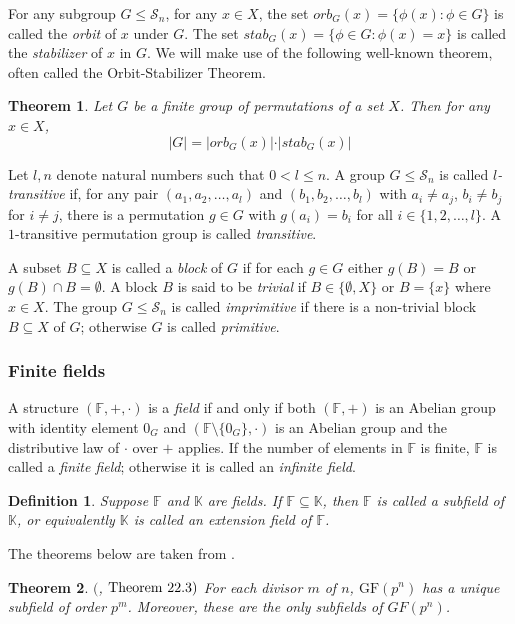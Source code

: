 \documentclass[11pt]{amsart}
\newcommand{\sym}{\mathcal{S}}
\newcommand{\GF}{\mathrm{GF}}
\newtheorem{definition}{{\bf Definition}}
\newtheorem{theorem}{{\bf Theorem }}
\begin{document}
For any subgroup $G\leq\sym_n$, for any $x\in X$, the set $orb_G(x)=\{\phi(x):\phi\in G\}$ is called the \emph{orbit} of $x$ under $G$. The set $stab_G(x)=\{\phi\in G:\phi (x)=x\}$ is called the \emph{stabilizer} of $x$ in $G$. We will make use of the following well-known theorem, often called the Orbit-Stabilizer Theorem.

\begin{theorem}
Let $G$ be a finite group of permutations of a set $X$. Then for any $x\in X$, 
\[
\vert G\vert=\vert orb_G(x)\vert\cdot\vert stab_G(x)\vert
\]
\end{theorem}
Let $l, n$ denote natural numbers such that $0<l\leq n$. A group $G\leq \sym_n$ is called \emph {$l$-transitive} if, for any pair $(a_1,a_2,\ldots,a_l)$ and $(b_1,b_2,\ldots,b_l)$ with $a_i\neq a_j$, $b_i\neq b_j$ for $i\neq j$, there is a permutation $g\in G$ with $g(a_i)=b_i$ for all $i\in \{1,2,\ldots,l\}$. A $1$-transitive permutation group is called \emph {transitive}. 

A subset $B\subseteq X$ is called a \emph {block} of $G$ if for each $g\in G$ either $g(B)=B$ or $g(B)\cap B =\emptyset$. 
A block $B$ is said to be \emph {trivial} if $B\in\{\emptyset,X\}$ or $B=\{x\}$ where $x\in X$. The group $G\leq \sym_n$ is called \emph{imprimitive} if there is a non-trivial block $B\subseteq X$ of $G$; otherwise $G$ is called \emph{primitive}. 
 


\subsubsection{\bf Finite fields}
A structure $(\mathbb {F},+,\cdot)$ is a \emph {field} if and only if both $(\mathbb {F},+)$ is an Abelian group with identity element $0_G$ and $({\mathbb F}\setminus\{0_G\},\cdot)$ is an Abelian group and the distributive law of $\cdot$ over $+$ applies. If the number of elements in $\mathbb F$ is finite, $\mathbb F$ is called a \emph {finite field}; otherwise it is called an \emph {infinite field}.
\begin{definition}
Suppose $\mathbb{F}$ and $\mathbb K $ are fields. If  $\mathbb{F}\subseteq \mathbb K$, then $\mathbb{F}$ is called a {\emph subfield} of $\mathbb K$, or equivalently $\mathbb{K}$ is called an {\emph extension field} of $\mathbb{F}$.
\end{definition}
The theorems below are taken from \cite{G}.

\begin{theorem}\label{FM1}$($\cite{G}, $\text{\textnormal{Theorem }} 22.3)$
For each divisor $m$ of $n$, $\GF(p^n)$ has a unique subfield of order $p^m$. Moreover, these are the only subfields of $GF(p^n)$.
\end{theorem}
\end{document}
